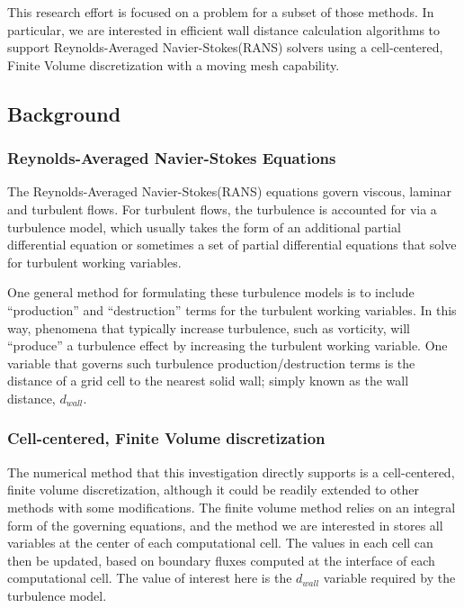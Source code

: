 \documentclass[]{aiaa-tc}%
\begin{document}
This research effort is focused on a problem for a subset
of those methods. In particular, we are interested in efficient wall
distance calculation algorithms to support Reynolds-Averaged
Navier-Stokes(RANS) solvers using a cell-centered, Finite Volume discretization with a
moving mesh capability.

\subsection{Background}

\subsubsection{Reynolds-Averaged Navier-Stokes Equations}
The Reynolds-Averaged Navier-Stokes(RANS) equations govern viscous, laminar
and turbulent flows. For turbulent flows, the turbulence is accounted
for via a turbulence model, which usually takes the
form of an additional partial differential equation or sometimes a set
of partial differential equations that solve for turbulent working
variables.

One general method for formulating these turbulence models is to
include ``production'' and ``destruction'' terms for the turbulent
working variables. In this way, phenomena that typically increase
turbulence, such as vorticity, will ``produce'' a turbulence effect by
increasing the turbulent working variable. One variable that governs such
turbulence production/destruction terms is the distance of a grid cell to
the nearest solid wall; simply known as the wall distance, $d_{wall}$.\cite{allmaras:12}


\subsubsection{Cell-centered, Finite Volume discretization}
The numerical method that this investigation directly supports is a
cell-centered, finite volume discretization, although it could be
readily extended to other methods with some modifications. The finite
volume method relies on an integral form of the governing equations,
and the method we are interested in stores all variables at the center
of each computational cell. The values in each cell can then be
updated, based on boundary fluxes computed at the interface of each
computational cell.\cite{hirsch:94} The value of interest here is the $d_{wall}$
variable required by the turbulence model.
\end{document}
